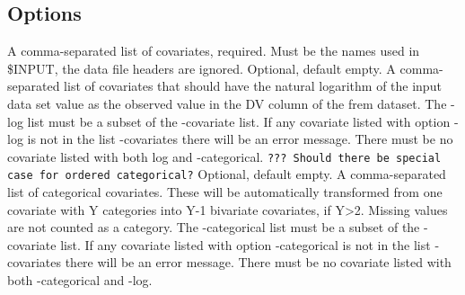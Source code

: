 \subsection{Options}
\begin{optionlist}
A comma-separated list of covariates, required. Must be the names used in \$INPUT, the data file headers are ignored.
\nextopt
{}
Optional, default empty. A comma-separated list of covariates 
that should have the natural logarithm
of the input data set value as the observed value in the DV column of the frem dataset.
The -log list must be a subset of the -covariate list.
If any covariate listed with option -log is not in the list -covariates there will be an error message.
There must be no covariate listed with both log and -categorical.
\nextopt
{} 
{\Large \texttt{??? Should there be special case for ordered categorical?}}
Optional, default empty.
A comma-separated list of categorical covariates. These will be automatically transformed from
one covariate with Y categories into Y-1 bivariate covariates, if Y>2. Missing values are not counted as a category.
The -categorical list must be a subset of the -covariate list.
If any covariate listed with option -categorical is not in the list -covariates there will be an error message.
There must be no covariate listed with both -categorical and -log.
\nextopt

\end{optionlist}
